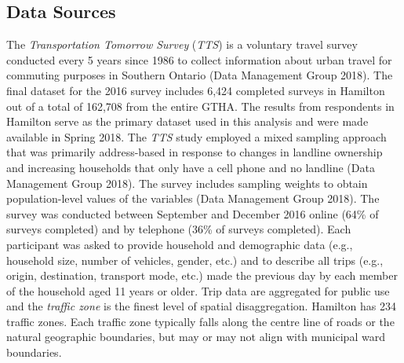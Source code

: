 \documentclass[smallextended]{svjour3}       %
\begin{document}
\hypertarget{data-sources}{%
\subsection{Data Sources}\label{data-sources}}

The \emph{Transportation Tomorrow Survey} (\emph{TTS}) is a voluntary
travel survey conducted every 5 years since 1986 to collect information
about urban travel for commuting purposes in Southern Ontario (Data
Management Group 2018). The final dataset for the 2016 survey includes
6,424 completed surveys in Hamilton out of a total of 162,708 from the
entire GTHA. The results from respondents in Hamilton serve as the
primary dataset used in this analysis and were made available in Spring
2018. The \emph{TTS} study employed a mixed sampling approach that was
primarily address-based in response to changes in landline ownership and
increasing households that only have a cell phone and no landline (Data
Management Group 2018). The survey includes sampling weights to obtain
population-level values of the variables (Data Management Group 2018).
The survey was conducted between September and December 2016 online
(64\% of surveys completed) and by telephone (36\% of surveys
completed). Each participant was asked to provide household and
demographic data (e.g., household size, number of vehicles, gender,
etc.) and to describe all trips (e.g., origin, destination, transport
mode, etc.) made the previous day by each member of the household aged
11 years or older. Trip data are aggregated for public use and the
\emph{traffic zone} is the finest level of spatial disaggregation.
Hamilton has 234 traffic zones. Each traffic zone typically falls along
the centre line of roads or the natural geographic boundaries, but may
or may not align with municipal ward boundaries.
\end{document}
